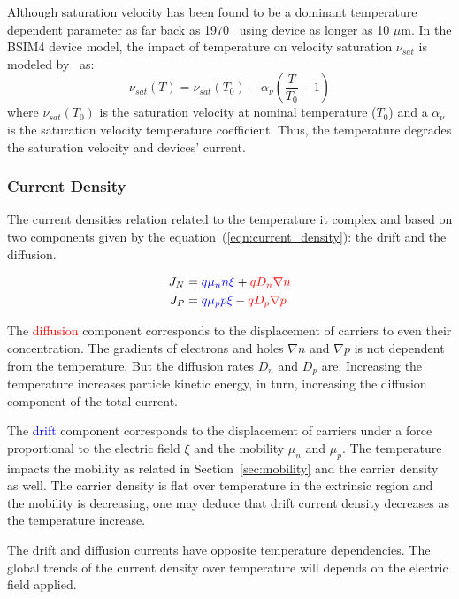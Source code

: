 Although saturation velocity has been found to be a dominant temperature dependent parameter as far back as 1970~\cite{Fowler1970} using device as longer as 10 \(\mu \)m. In the BSIM4 device model, the impact of temperature on velocity saturation \(\nu_{sat} \) is modeled by~\cite{Chain1997} as:
\begin{equation}
\label{eqn:vsat_T}
\nu_{sat}(T) = \nu_{sat}(T_0) - \alpha_\nu \left(\frac{T}{T_0}-1\right)
\end{equation}
where \(\nu_{sat}(T_0)\) is the saturation velocity at nominal temperature (\(T_0 \)) and a \(\alpha_\nu \) is the saturation velocity temperature coefficient. Thus, the temperature degrades the saturation velocity and devices' current.

\subsubsection{Current Density}        %
\label{sec:current_density}
The current densities relation related to the temperature it complex and based on two components given by the equation~(\ref{eqn:current_density}): the drift and the diffusion. 

\begin{align}
\label{eqn:current_density}
J_N &= \textcolor{blue}{q\mu_n n \xi} + \textcolor{red}{qD_n\nabla n} \\
J_P &= \textcolor{blue}{q\mu_p p \xi} - \textcolor{red}{qD_p\nabla p} 
\end{align}

The \textcolor{red}{diffusion} component corresponds to the displacement of carriers to even their concentration. The gradients of electrons and holes \(\nabla n \) and \(\nabla p \) is not dependent from the temperature. But the diffusion rates \(D_n \) and \(D_p \) are. Increasing the temperature increases particle kinetic energy, in turn, increasing the diffusion component of the total current.

The \textcolor{blue}{drift} component corresponds to the displacement of carriers under a force proportional to the electric field \(\xi \) and the mobility \(\mu_n \) and \(\mu_p \). The temperature impacts the mobility as related in Section~\ref{sec:mobility} and the carrier density as well. The carrier density is flat over temperature in the extrinsic region and the mobility is decreasing, one may deduce that drift current density decreases as the temperature increase.

The drift and diffusion currents have opposite temperature dependencies. The global trends of the current density over temperature will depends on the electric field applied.

